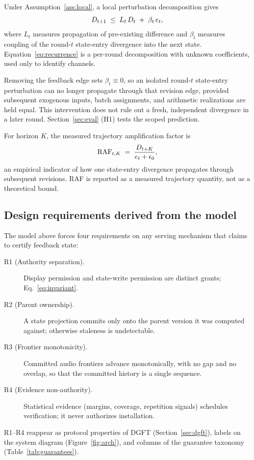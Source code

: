 Under Assumption~\ref{ass:local}, a local perturbation decomposition gives
\begin{equation}\label{eq:recurrence}
  D_{t+1} \;\le\; L_t\,D_t \;+\; \beta_t\,e_t ,
\end{equation}
where $L_t$ measures propagation of pre-existing difference and $\beta_t$
measures coupling of the round-$t$ state-entry divergence into the next
state. Equation~\eqref{eq:recurrence} is a per-round decomposition with
unknown coefficients, used only to identify channels.

\begin{remark}\label{rem:causal}
Removing the feedback edge sets $\beta_t \equiv 0$, so an isolated round-$t$
state-entry perturbation can no longer propagate through that revision edge,
provided subsequent exogenous inputs, batch assignments, and arithmetic
realizations are held equal. This intervention does not rule out a fresh,
independent divergence in a later round. Section~\ref{sec:eval} (H1) tests
the scoped prediction.
\end{remark}

\begin{definition}\label{def:raf}
For horizon $K$, the measured trajectory amplification factor is
\[
  \mathrm{RAF}_{t,K} \;=\; \frac{D_{t+K}}{e_t + \epsilon_0},
\]
an empirical indicator of how one state-entry divergence propagates through
subsequent revisions. RAF is reported as a measured trajectory quantity, not
as a theoretical bound.
\end{definition}

\subsection{Design requirements derived from the model}\label{sec:model:reqs}

The model above forces four requirements on any serving mechanism that
claims to certify feedback state:
\begin{description}
  \item[R1 (Authority separation).] Display permission and state-write
    permission are distinct grants; Eq.~\eqref{eq:invariant}.
  \item[R2 (Parent ownership).] A state projection commits only onto the
    parent version it was computed against; otherwise staleness is
    undetectable.
  \item[R3 (Frontier monotonicity).] Committed audio frontiers advance
    monotonically, with no gap and no overlap, so that the committed
    history is a single sequence.
  \item[R4 (Evidence non-authority).] Statistical evidence (margins,
    coverage, repetition signals) schedules verification; it never
    authorizes installation.
\end{description}
R1--R4 reappear as protocol properties of DGFT
(Section~\ref{sec:dgft}), labels on the system diagram
(Figure~\ref{fig:arch}), and columns of the guarantee taxonomy
(Table~\ref{tab:guarantees}).

